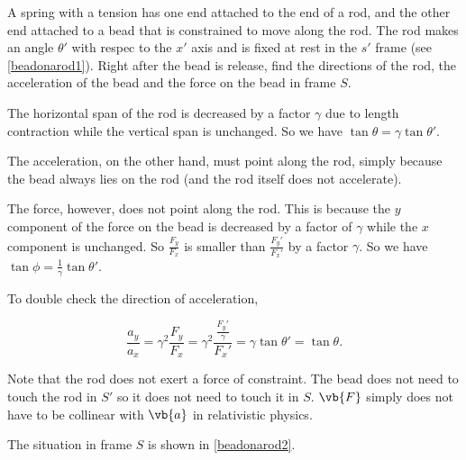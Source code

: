 \documentclass[english,a4paper,12pt]{report}
\begin{document}
{A spring with a tension has one end attached to the end of a rod, and the other end attached to a bead that is constrained to move along the rod. The rod makes an angle \(\theta '\) with respec to the \(x'\) axis and is fixed at rest in the \(s'\) frame (see \cref{beadonarod1}). Right after the bead is release, find the directions of the rod, the acceleration of the bead and the force on the bead in frame \(S\).}
{The horizontal span of the rod is decreased by a factor \(\gamma \) due to length contraction while the vertical span is unchanged. So we have \(\tan \theta = \gamma \tan \theta '\). 

The acceleration, on the other hand, must point along the rod, simply because the bead always lies on the rod (and the rod itself does not accelerate). 

The force, however, does not point along the rod. This is because the \(y\) component of the force on the bead is decreased by a factor of \(\gamma \) while the \(x\) component is unchanged. So \(\frac{F_{y}}{F_{x} } \) is smaller than \(\frac{F_{y}'}{F_{x}'} \) by a factor \(\gamma \). So we have \(\tan \phi = \frac{1}{\gamma }\tan \theta ' \). 

To double check the direction of acceleration, 

\begin{equation}
    \frac{a_{y} }{a_{x} } = \gamma ^2 \frac{F_{y} }{F_{x} } = \gamma ^2\frac{\frac{F_{y}' }{\gamma }  }{F_{x}' }  = \gamma \tan \theta ' = \tan \theta .  
\end{equation}

Note that the rod does not exert a force of constraint. The bead does not need to touch the rod in \(S'\) so it does not need to touch it in \(S\). \(\vb{F} \) simply does not have to be collinear with \(\vb{a} \) in relativistic physics.  

The situation in frame \(S\) is shown in \cref{beadonarod2}.

} 
\end{document}
